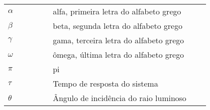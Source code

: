 

\begin{listasimb}

\begin{longtable}[l]{p{0.2\linewidth}p{0.7\linewidth}}
$\alpha$ & alfa, primeira letra do alfabeto grego\\
$\beta$ & beta, segunda letra do alfabeto grego\\
$\gamma$ & gama, terceira letra do alfabeto grego\\
$\omega$ & ômega, última letra do alfabeto grego\\
$\pi$ & pi \\
$\tau$ & Tempo de resposta do sistema\\
$\theta$ & Ângulo de incidência do raio luminoso\\
\end{longtable}

\end{listasimb}

